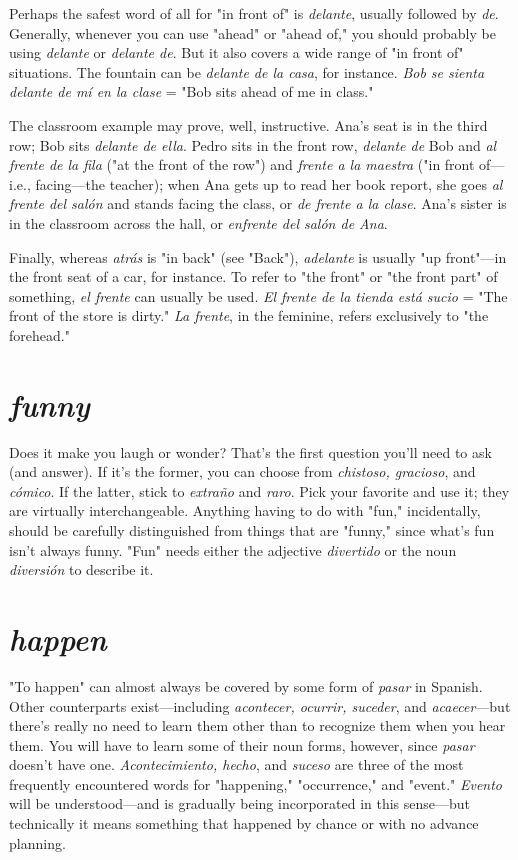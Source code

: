 Perhaps the safest word of all for "in front of" is \emph{delante}, usually followed by \emph{de}. Generally, whenever you can use "ahead" or
"ahead of," you should probably be using \emph{delante} or \emph{delante de}. But it
also covers a wide range of "in front of" situations. The fountain can
be \emph{delante de la casa}, for instance. \emph{Bob se sienta delante de mí en la
clase} = "Bob sits ahead of me in class."

The classroom example may prove, well, instructive. Ana's
seat is in the third row; Bob sits \emph{delante de ella}. Pedro sits in the front
row, \emph{delante de} Bob and \emph{al frente de la fila} ("at the front of the row")
and \emph{frente a la maestra} ("in front of---i.e., facing---the teacher); when
Ana gets up to read her book report, she goes \emph{al frente del salón} and
stands facing the class, or \emph{de frente a la clase}. Ana's sister is in the
classroom across the hall, or \emph{enfrente del salón de Ana}.

Finally, whereas \emph{atrás} is "in back" (see "Back"), \emph{adelante} is
usually "up front"---in the front seat of a car, for instance. To refer to
"the front" or "the front part" of something, \emph{el frente} can usually be
used. \emph{El frente de la tienda está sucio} = "The front of the store is
dirty." \emph{La frente}, in the feminine, refers exclusively to "the forehead."

\section{\emph{funny}}

Does it make you laugh or wonder? That's the first question
you'll need to ask (and answer). If it's the former, you can choose from
\emph{chistoso, gracioso}, and \emph{cómico}. If the latter, stick to \emph{extraño} and \emph{raro}.
Pick your favorite and use it; they are virtually interchangeable. Anything having to do with "fun," incidentally, should be carefully distinguished from things that are "funny," since what's fun isn't always
funny. "Fun" needs either the adjective \emph{divertido} or the noun \emph{diversión} to describe it.

\section{\emph{happen}}

"To happen" can almost always be covered by some form of
\emph{pasar} in Spanish. Other counterparts exist---including \emph{acontecer, ocurrir, suceder}, and \emph{acaecer}---but there's really no need to learn them
other than to recognize them when you hear them. You will have to
learn some of their noun forms, however, since \emph{pasar} doesn't have one.
\emph{Acontecimiento, hecho}, and \emph{suceso} are three of the most frequently
encountered words for "happening," "occurrence," and "event."
\emph{Evento} will be understood---and is gradually being incorporated in this
sense---but technically it means something that happened by chance
or with no advance planning.

